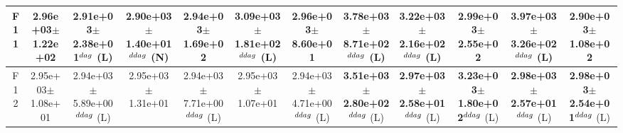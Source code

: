 \begin{table}[!t]
\begin{tabular}{c|ccccccccccc}
F11  & 2.96e+03$\pm$1.22e+02  & 2.91e+03$\pm$2.38e+01$^{\\dag}$ (L)  & 2.90e+03$\pm$1.40e+01$^{\\ddag}$ (N)  & 2.94e+03$\pm$1.69e+02   & \textbf{3.09e+03$\pm$1.81e+02}$^{\\ddag}$ (L)  & 2.96e+03$\pm$8.60e+01   & \textbf{3.78e+03$\pm$8.71e+02}$^{\\ddag}$ (L)  & \textbf{3.22e+03$\pm$2.16e+02}$^{\\ddag}$ (L)  & 2.99e+03$\pm$2.55e+02   & \textbf{3.97e+03$\pm$3.26e+02}$^{\\ddag}$ (L)  & 2.90e+03$\pm$1.08e+02  \\ \hline
F12  & 2.95e+03$\pm$1.08e+01  & 2.94e+03$\pm$5.89e+00$^{\\ddag}$ (L)  & 2.95e+03$\pm$1.31e+01   & 2.94e+03$\pm$7.71e+00$^{\\ddag}$ (L)  & 2.95e+03$\pm$1.07e+01   & 2.94e+03$\pm$4.71e+00$^{\\ddag}$ (L)  & \textbf{3.51e+03$\pm$2.80e+02}$^{\\ddag}$ (L)  & \textbf{2.97e+03$\pm$2.58e+01}$^{\\ddag}$ (L)  & \textbf{3.23e+03$\pm$1.80e+02}$^{\\ddag}$ (L)  & \textbf{2.98e+03$\pm$2.57e+01}$^{\\ddag}$ (L)  & \textbf{2.98e+03$\pm$2.54e+01}$^{\\ddag}$ (L) \\ \hline
\end{tabular}
\end{table}
